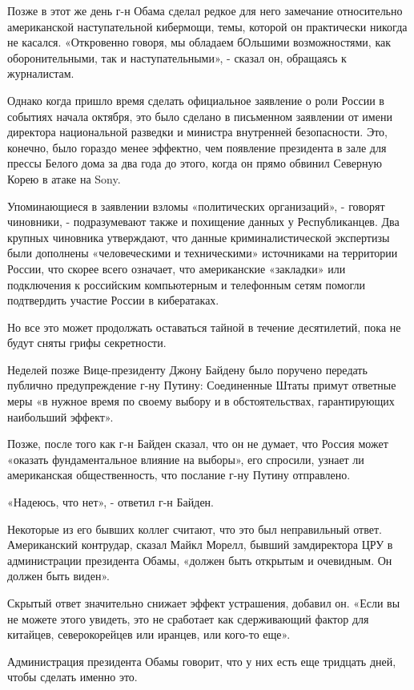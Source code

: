 Позже в этот же день г-н Обама сделал редкое для него замечание
относительно американской наступательной кибермощи, темы, которой он
практически никогда не касался. «Откровенно говоря, мы обладаем бОльшими
возможностями, как оборонительными, так и наступательными», - сказал он,
обращаясь к журналистам.

Однако когда пришло время сделать официальное заявление о роли России в
событиях начала октября, это было сделано в письменном заявлении от
имени директора национальной разведки и министра внутренней
безопасности. Это, конечно, было гораздо менее эффектно, чем появление
президента в зале для прессы Белого дома за два года до этого, когда он
прямо обвинил Северную Корею в атаке на Sony.

Упоминающиеся в заявлении взломы «политических организаций», - говорят
чиновники, - подразумевают также и похищение данных у Республиканцев.
Два крупных чиновника утверждают, что данные криминалистической
экспертизы были дополнены «человеческими и техническими» источниками на
территории России, что скорее всего означает, что американские
«закладки» или подключения к российским компьютерным и телефонным сетям
помогли подтвердить участие России в кибератаках.

Но все это может продолжать оставаться тайной в течение десятилетий,
пока не будут сняты грифы секретности.

Неделей позже Вице-президенту Джону Байдену было поручено передать
публично предупреждение г-ну Путину: Соединенные Штаты примут ответные
меры «в нужное время по своему выбору и в обстоятельствах, гарантирующих
наибольший эффект».

Позже, после того как г-н Байден сказал, что он не думает, что Россия
может «оказать фундаментальное влияние на выборы», его спросили, узнает
ли американская общественность, что послание г-ну Путину отправлено.

«Надеюсь, что нет», - ответил г-н Байден.

Некоторые из его бывших коллег считают, что это был неправильный ответ.
Американский контрудар, сказал Майкл Морелл, бывший замдиректора ЦРУ в
администрации президента Обамы, «должен быть открытым и очевидным. Он
должен быть виден».

Скрытый ответ значительно снижает эффект устрашения, добавил он. «Если
вы не можете этого увидеть, это не сработает как сдерживающий фактор для
китайцев, северокорейцев или иранцев, или кого-то еще».

Администрация президента Обамы говорит, что у них есть еще тридцать
дней, чтобы сделать именно это.


